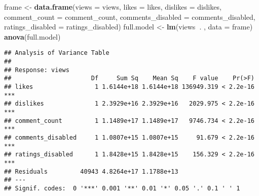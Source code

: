 \documentclass[]{article}
\newenvironment{Shaded}{\begin{snugshade}}{\end{snugshade}}
\newcommand{\DataTypeTok}[1]{\textcolor[rgb]{0.13,0.29,0.53}{#1}}
\newcommand{\KeywordTok}[1]{\textcolor[rgb]{0.13,0.29,0.53}{\textbf{#1}}}
\newcommand{\NormalTok}[1]{#1}
\newcommand{\OperatorTok}[1]{\textcolor[rgb]{0.81,0.36,0.00}{\textbf{#1}}}
\newcommand{\StringTok}[1]{\textcolor[rgb]{0.31,0.60,0.02}{#1}}
\begin{document}
\begin{Shaded}
\begin{Highlighting}[]
\NormalTok{frame <-}\StringTok{ }\KeywordTok{data.frame}\NormalTok{(}\DataTypeTok{views =}\NormalTok{ views, }\DataTypeTok{likes =}\NormalTok{ likes, }\DataTypeTok{dislikes =}\NormalTok{ dislikes, }\DataTypeTok{comment_count =}\NormalTok{ comment_count, }\DataTypeTok{comments_disabled =}\NormalTok{ comments_disabled, }\DataTypeTok{ratings_disabled =}\NormalTok{ ratings_disabled)}
\NormalTok{full.model <-}\StringTok{ }\KeywordTok{lm}\NormalTok{(views}\OperatorTok{~}\NormalTok{. , }\DataTypeTok{data =}\NormalTok{ frame)}
\KeywordTok{anova}\NormalTok{(full.model)}
\end{Highlighting}
\end{Shaded}

\begin{verbatim}
## Analysis of Variance Table
## 
## Response: views
##                      Df     Sum Sq    Mean Sq    F value    Pr(>F)    
## likes                 1 1.6144e+18 1.6144e+18 136949.319 < 2.2e-16 ***
## dislikes              1 2.3929e+16 2.3929e+16   2029.975 < 2.2e-16 ***
## comment_count         1 1.1489e+17 1.1489e+17   9746.734 < 2.2e-16 ***
## comments_disabled     1 1.0807e+15 1.0807e+15     91.679 < 2.2e-16 ***
## ratings_disabled      1 1.8428e+15 1.8428e+15    156.329 < 2.2e-16 ***
## Residuals         40943 4.8264e+17 1.1788e+13                         
## ---
## Signif. codes:  0 '***' 0.001 '**' 0.01 '*' 0.05 '.' 0.1 ' ' 1
\end{verbatim}
\end{document}
